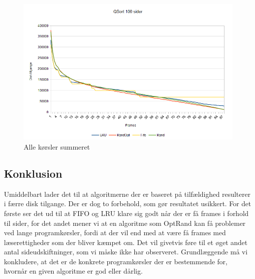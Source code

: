 \begin{figure}[ht]
\centerline{\includegraphics[scale=1]{graph/stat_sort}}
\FloatBarrier
\caption{Alle kørsler summeret}
\label{fig:sort}
\end{figure}

\subsection{Konklusion}
Umiddelbart lader det til at algoritmerne der er baseret på tilfældighed resulterer i færre disk tilgange. Der er dog to forbehold, som gør resultatet usikkert. For det første ser det ud til at FIFO og LRU klare sig godt når der er få frames i forhold til sider, for det andet mener vi at en algoritme som OptRand kan få problemer ved lange programkørsler, fordi at der vil end med at være få frames med læserettigheder som der bliver kæmpet om. Det vil givetvis føre til et øget andet antal sideudskiftninger, som vi måske ikke har observeret. Grundlæggende må vi konkludere, at det er de konkrete programkørsler der er bestemmende for, hvornår en given algoritme er god eller dårlig. 
